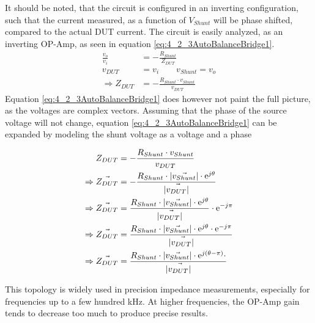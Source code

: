 It should be noted, that the circuit is configured in an inverting configuration, such that the current measured, as a function of $V_{Shunt}$ will be  phase shifted, compared to the actual DUT current. The circuit is easily analyzed, as an inverting OP-Amp, as seen in equation \ref{eq:4_2_3AutoBalanceBridge1}.
\begin{equation}
    \label{eq:4_2_3AutoBalanceBridge1}
    \begin{split}
        \frac{v_o}{v_i} &= -\frac{R_{Shunt}}{Z_{DUT}}\\
        v_{DUT} &= v_i \qquad v_{Shunt} = v_o \\
        \Rightarrow Z_{DUT} &= -\frac{R_{Shunt}\cdot v_{Shunt}}{v_{DUT}}
    \end{split}
\end{equation}
Equation \ref{eq:4_2_3AutoBalanceBridge1} does however not paint the full picture, as the voltages are complex vectors. Assuming that the phase of the source voltage will not change, equation \ref{eq:4_2_3AutoBalanceBridge1} can be expanded by modeling 
the shunt voltage as a voltage and a phase

\begin{equation}
    \label{eq:4_2_3AutoBalanceBridge2}
    \begin{split}
        Z_{DUT} &= -\frac{R_{Shunt}\cdot v_{Shunt}}{v_{DUT}} \\
        \Rightarrow \vec{Z_{DUT}} &= -\frac{R_{Shunt}\cdot |\vec{v_{Shunt}}|\cdot\mathrm{e} ^{j\theta}}{|\vec{v_{DUT}|}} \\
        \Rightarrow \vec{Z_{DUT}} &= \frac{R_{Shunt}\cdot |\vec{v_{Shunt}}|\cdot\mathrm{e} ^{j\theta}}{|\vec{v_{DUT}|}} \cdot \mathrm{e} ^{-j\pi} \\
        \Rightarrow \vec{Z_{DUT}} &= \frac{R_{Shunt}\cdot |\vec{v_{Shunt}}|\cdot\mathrm{e} ^{j\theta}\cdot \mathrm{e} ^{-j\pi}}{|\vec{v_{DUT}|}}  \\
        \Rightarrow \vec{Z_{DUT}} &= \frac{R_{Shunt}\cdot |\vec{v_{Shunt}}|\cdot\mathrm{e} ^{j(\theta-\pi)}\cdot}{|\vec{v_{DUT}|}}
    \end{split}
\end{equation}

This topology is widely used in precision impedance measurements, especially for frequencies up to a few hundred kHz. At higher frequencies, the OP-Amp gain tends to decrease too much to produce precise results.